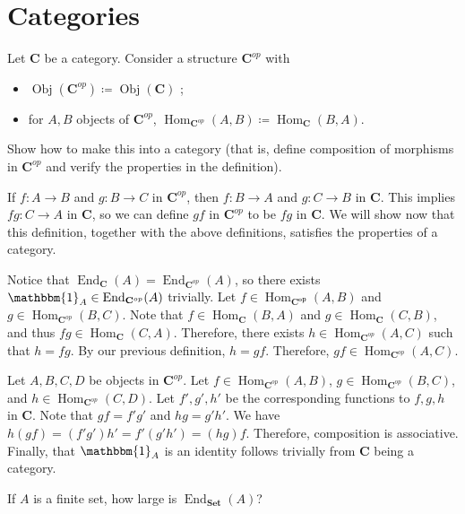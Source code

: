 \documentclass[11pt]{report}
\DeclareMathOperator{\End}{End}
\DeclareMathOperator{\Hom}{Hom}
\DeclareMathOperator{\Obj}{Obj}
\begin{document}
\section{Categories}
\begin{exercise}
	Let $\mathbf{C}$ be a category. Consider a structure $\mathbf{C}^{op}$ with
	\begin{itemize}
		\item $\Obj( \mathbf{C}^{op} ) \coloneqq \Obj( \mathbf{C} ) $ ;
		\item for $A,B$ objects of $\mathbf{C}^{op}$, $\Hom_{\mathbf{C}^{op}}(A , B) \coloneqq \Hom_{\mathbf{C}}(B , A) $.
	\end{itemize}
	Show how to make this into a category (that is, define composition of morphisms in $\mathbf{C}^{op}$ and verify the properties in the definition).
\end{exercise}
\begin{solution}
	If $f : A \to B$ and $g : B \to C$ in $\mathbf{C}^{op}$, then $f : B \to A$ and $g : C \to B$ in $\mathbf{C}$. This implies $fg : C \to A$ in $\mathbf{C}$, so we can define $gf$ in $\mathbf{C}^{op}$ to be $fg$ in $\mathbf{C}$. We will show now that this definition, together with the above definitions, satisfies the properties of a category.

	Notice that $\End_{\mathbf{C}}(A) =\End_{\mathbf{C}^{op}}(A) $, so there exists $\mathbbm{1}_{A} \in \End_{\mathbf{C}^{op}}(A) $ trivially. Let $f\in \Hom_{\mathbf{C^{op}}}(A , B) $ and $g\in \Hom_{\mathbf{C}^{op}}(B , C) $. Note that $f\in \Hom_{\mathbf{C}}(B , A) $ and $g\in \Hom_{\mathbf{C}}(C , B) $, and thus $fg\in \Hom_{\mathbf{C}}(C , A) $.  Therefore, there exists $h\in \Hom_{\mathbf{C}^{op}}(A , C) $ such that $h=fg$. By our previous definition, $h=gf$. Therefore, $gf\in \Hom_{\mathbf{C}^{op}}(A , C) $.

	Let $A,B,C,D$ be objects in $\mathbf{C}^{op}$. Let $f\in \Hom_{\mathbf{C}^{op}}(A , B) $, $g\in \Hom_{\mathbf{C}^{op}}(B , C) $, and $h\in \Hom_{\mathbf{C}^{op}}(C , D) $. Let $f',g',h'$ be the corresponding functions to $f,g,h$ in $\mathbf{C}$. Note that $gf=f'g'$ and $hg=g'h'$. We have $h(gf)=(f'g')h'=f'(g'h')=(hg)f$. Therefore, composition is associative. Finally, that $\mathbbm{1}_{A} $ is an identity follows trivially from $\mathbf{C}$ being a category.
\end{solution}
\begin{exercise}
	If $A$ is a finite set, how large is $\End_{\mathbf{Set}}(A) $?
\end{exercise}
\end{document}
